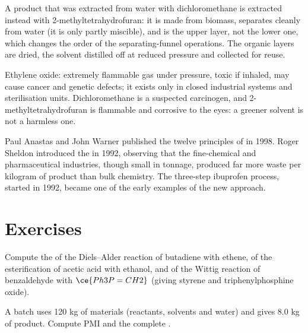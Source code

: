 \begin{inthelab}
A product that was extracted from water with dichloromethane is extracted
instead with 2-methyltetrahydrofuran: it is made from biomass, separates
cleanly from water (it is only partly miscible), and is the upper layer, not
the lower one, which changes the order of the separating-funnel operations. The
organic layers are dried, the solvent distilled off at reduced pressure and
collected for reuse.
\end{inthelab}

\begin{safety}{}
Ethylene oxide: extremely flammable gas under pressure, toxic if inhaled, may
cause cancer and genetic defects; it exists only in closed industrial systems
and sterilisation units. Dichloromethane is a suspected carcinogen, and
2-methyltetrahydrofuran is flammable and corrosive to the eyes: a greener solvent
is not a harmless one.
\end{safety}

\begin{history}
Paul Anastas and John Warner published the twelve principles of  in 1998. Roger Sheldon introduced the  in 1992, observing that
the fine-chemical and pharmaceutical industries, though small in tonnage,
produced far more waste per kilogram of product than bulk chemistry. The
three-step ibuprofen process, started in 1992, became one of the early
examples of the new approach.
\end{history}

\section{Exercises}

\begin{exercise}[$\star$]\label{exo:b3:green-industrial:1}
Compute the  of the Diels--Alder reaction of butadiene with ethene, of
the esterification of acetic acid with ethanol, and of the Wittig reaction of
benzaldehyde with $\ce{Ph3P=CH2}$ (giving styrene and triphenylphosphine oxide).
\end{exercise}

\begin{exercise}[$\star$]\label{exo:b3:green-industrial:2}
A batch uses 120 kg of materials (reactants, solvents and water) and gives 8.0 kg of
product. Compute PMI and the complete .
\end{exercise}

